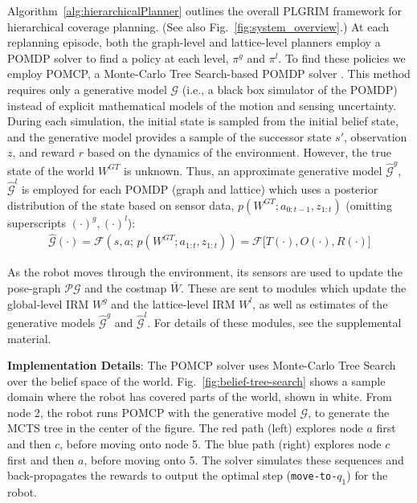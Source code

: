 \documentclass[letterpaper]{article} %
\newcommand{\ph}[1]{{\textbf{#1}:}} %
\begin{document}
Algorithm~\ref{alg:hierarchicalPlanner} outlines the overall PLGRIM framework for hierarchical coverage planning.  (See also Fig.~\ref{fig:system_overview}.)
At each replanning episode, both the graph-level and lattice-level planners employ a POMDP solver to find a policy at each level, $\pi^g$ and $\pi^l$.  To find these policies we employ POMCP, a Monte-Carlo Tree Search-based POMDP solver \cite{silver2010monte}.  This method requires only a generative model $\mathcal{G}$  (i.e., a black box simulator of the POMDP) instead of explicit mathematical models of the motion and sensing uncertainty. During each simulation, the initial state is sampled from the initial belief state, and the generative model provides a sample of the successor state $s'$, observation $z$, and reward $r$ based on the dynamics of the environment. However, the true state of the world $W^{GT}$ is unknown.  Thus, an approximate generative model $\hat{\mathcal{G}}^g$, $\hat{\mathcal{G}}^l$ is employed for each POMDP (graph and lattice) which uses a posterior distribution of the state  based on sensor data, $p(W^{GT}; a_{0:t-1}, z_{1:t})$ (omitting superscripts $(\cdot)^g, (\cdot)^l$):
\begin{align}
    \hat{\mathcal{G}}(\cdot) = \mathcal{F}(s, a; \, p(W^{GT}; a_{1:t}, z_{1:t})) = \mathcal{F}\big[T(\cdot), O(\cdot), R(\cdot)\big]%
\end{align}

As the robot moves through the environment, its sensors are used to update the pose-graph $\mathcal{PG}$ and the %
costmap $\bar{W}$.  These are sent to modules which update the global-level IRM $W^g$ and the lattice-level IRM $W^l$, as well as estimates of the generative models $\hat{\mathcal{G}}^g$ and $\hat{\mathcal{G}}^l$. For details of these modules, see the supplemental material.

\ph{Implementation Details}
The POMCP solver uses Monte-Carlo Tree Search over the belief space of the world. Fig.~\ref{fig:belief-tree-search} shows a sample domain where the robot has covered parts of the world, shown in white. From node 2, the robot runs POMCP with the generative model $\mathcal{G}$, to generate the MCTS tree in the center of the figure. The red path (left) explores node $a$ first and then $c$, before moving onto node 5. The blue path (right) explores node $c$ first and then $a$, before moving onto 5. The solver simulates these sequences and back-propagates the rewards to output the optimal step (\texttt{move-to-$q_1$}) for the robot.
\end{document}
